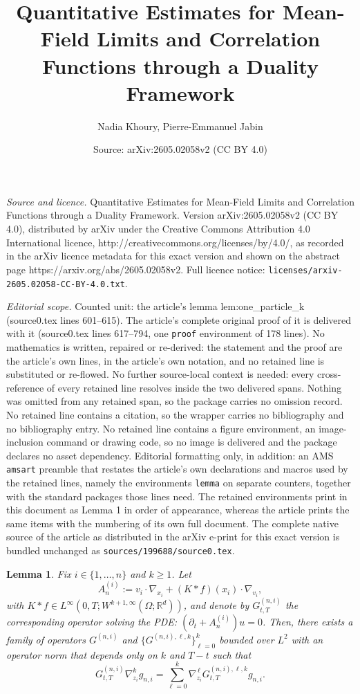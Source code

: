 \documentclass[10pt,a4paper]{amsart}
\title{Quantitative Estimates for Mean-Field Limits and Correlation Functions through a Duality Framework}
\author{Nadia Khoury, Pierre-Emmanuel Jabin}
\date{Source: arXiv:2605.02058v2 (CC BY 4.0)}
\newtheorem{lemma}{Lemma}
\begin{document}
\maketitle

\noindent\emph{Source and licence.} Quantitative Estimates for Mean-Field Limits and Correlation Functions through a Duality Framework. Version arXiv:2605.02058v2 (CC BY 4.0), distributed by arXiv under the Creative Commons Attribution 4.0 International licence, http://creativecommons.org/licenses/by/4.0/, as recorded in the arXiv licence metadata for this exact version and shown on the abstract page https://arxiv.org/abs/2605.02058v2. Full licence notice: \texttt{licenses/arxiv-2605.02058-CC-BY-4.0.txt}.\par\smallskip

\noindent\textit{Editorial scope.} Counted unit: the article's lemma lem:one\_particle\_k (source0.tex lines 601--615). The article's complete original proof of it is delivered with it (source0.tex lines 617--794, one \texttt{proof} environment of 178 lines). No mathematics is written, repaired or re-derived: the statement and the proof are the article's own lines, in the article's own notation, and no retained line is substituted or re-flowed.  No further source-local context is needed: every cross-reference of every retained line resolves inside the two delivered spans.  Nothing was omitted from any retained span, so the package carries no omission record.  No retained line contains a citation, so the wrapper carries no bibliography and no bibliography entry.  No retained line contains a figure environment, an image-inclusion command or drawing code, so no image is delivered and the package declares no asset dependency.  Editorial formatting only, in addition: an AMS \texttt{amsart} preamble that restates the article's own declarations and macros used by the retained lines, namely the environments \texttt{lemma} on separate counters, together with the standard packages those lines need.  The retained environments print in this document as Lemma 1 in order of appearance, whereas the article prints the same items with the numbering of its own full document.  The complete native source of the article as distributed in the arXiv e-print for this exact version is bundled unchanged as \texttt{sources/199688/source0.tex}.
\begin{lemma} \label{lem:one_particle_k} 
Fix $i\in\{1,\dots,n\}$ and $k\ge 1$.
Let
\[
A_n^{(i)} := v_i\cdot\nabla_{x_i} + (K*f)(x_i)\cdot\nabla_{v_i},
\]
with $K \ast f \in L^{\infty}\left(0,T ;W^{k+1,\infty}(\Omega ; \mathbb{R}^d) \right)$, and denote by $G^{(n,i)}_{t,T}$ the corresponding operator solving the PDE: $( \partial_t+A_n^{(i)} )u=0$.
Then, there exists a family of operators $G^{(n,i)}$ and $\{G^{(n,i),\ell,k}\}_{\ell=0}^k$
bounded over $L^2$ with an operator norm that depends only on $k$ and $T-t$
such that 
\[
G_{t,T}^{(n,i)}\nabla^k_{z_i} g_{n,i}=\sum_{\ell =0}^k\nabla_{z_i}^{\,\ell}
G^{(n,i),\ell,k}_{t,T} g_{n,i}.
\]
\end{lemma}
\end{document}
